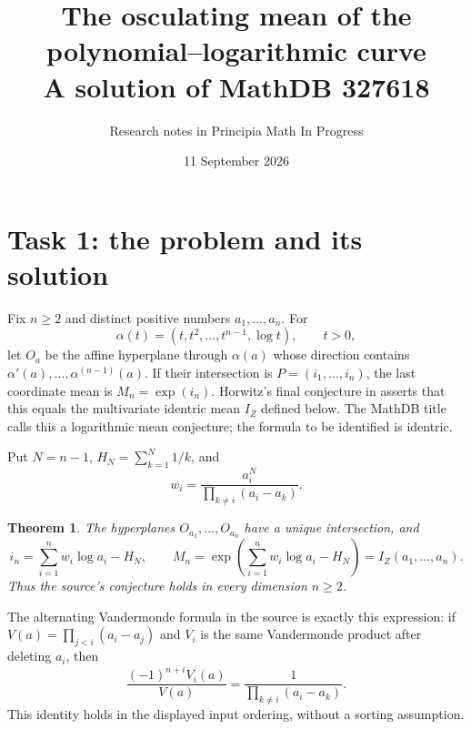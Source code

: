 \documentclass[11pt]{article}
\title{The osculating mean of the polynomial--logarithmic curve\\
\large A solution of MathDB 327618}
\author{Research notes in Principia Math In Progress}
\date{11 September 2026}
\newtheorem{theorem}{Theorem}
\begin{document}
\maketitle

\section{Task 1: the problem and its solution}
Fix $n\geq2$ and distinct positive numbers $a_1,\ldots,a_n$. For
\[
 \alpha(t)=(t,t^2,\ldots,t^{n-1},\log t),\qquad t>0,
\]
let $O_a$ be the affine hyperplane through $\alpha(a)$ whose direction
contains $\alpha'(a),\ldots,\alpha^{(n-1)}(a)$. If their intersection is
$P=(i_1,\ldots,i_n)$, the last coordinate mean is $M_n=\exp(i_n)$.
Horwitz's final conjecture in \cite{horwitz} asserts that this equals the
multivariate identric mean $I_Z$ defined below. The MathDB title calls this
a logarithmic mean conjecture; the formula to be identified is identric.

Put $N=n-1$, $H_N=\sum_{k=1}^N1/k$, and
\[
 w_i=\frac{a_i^N}{\prod_{k\ne i}(a_i-a_k)}.
\]
\begin{theorem}\label{main}
The hyperplanes $O_{a_1},\ldots,O_{a_n}$ have a unique intersection, and
\[
 i_n=\sum_{i=1}^n w_i\log a_i-H_N,
 \qquad
 M_n=\exp\left(\sum_{i=1}^n w_i\log a_i-H_N\right)=I_Z(a_1,\ldots,a_n).
\]
Thus the source's conjecture holds in every dimension $n\geq2$.
\end{theorem}
The alternating Vandermonde formula in the source is exactly this expression:
if $V(a)=\prod_{j<i}(a_i-a_j)$ and $V_i$ is the same Vandermonde product
after deleting $a_i$, then
\[
 \frac{(-1)^{n+i}V_i(a)}{V(a)}
 =\frac1{\prod_{k\ne i}(a_i-a_k)}.
\]
This identity holds in the displayed input ordering, without a sorting
assumption.
\end{document}
